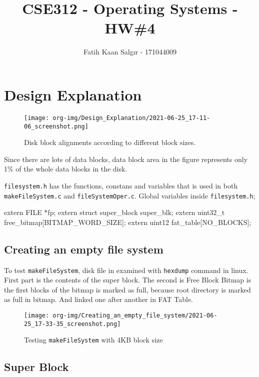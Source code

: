 \documentclass[a4paper]{article}
\author{Fatih Kaan Salgır - 171044009}
\date{}
\title{CSE312 - Operating Systems - HW\#4}
\begin{document}
\maketitle

\section*{Design Explanation}
\label{sec:orgc2cf438}

\quad

\begin{figure}[htbp]
\centering
\texttt{[image: org-img/Design\_Explanation/2021-06-25\_17-11-06\_screenshot.png]}
\caption{Disk block alignments according to different block sizes.}
\end{figure}

\quad

Since there are lots of data blocks, data block area in the figure represents only 1\% of the whole data blocks in the disk.

\texttt{filesystem.h} has the functions, constans and variables that is used in both \texttt{makeFileSystem.c} and \texttt{fileSystemOper.c}. Global variables inside \texttt{filesystem.h};
\quad

\begin{ccode}
extern FILE *fp;
extern struct super_block super_blk;
extern uint32_t free_bitmap[BITMAP_WORD_SIZE];
extern uint12 fat_table[NO_BLOCKS];
\end{ccode}


\subsection*{Creating an empty file system}
\label{sec:org1d761bb}

To test \texttt{makeFileSystem}, disk file in examined with \texttt{hexdump} command in linux. First part is the  contents of the super block. The second is Free Block Bitmap is the first blocks of the bitmap is marked as full, because root directory is marked as full in bitmap. And linked one after another in FAT Table.

\begin{figure}[htbp]
\centering
\texttt{[image: org-img/Creating\_an\_empty\_file\_system/2021-06-25\_17-33-35\_screenshot.png]}
\caption{Testing \texttt{makeFileSystem} with 4KB block size}
\end{figure}

\newpage
\quad

\subsection*{Super Block}
\label{sec:orgc48c8e1}
\end{document}
